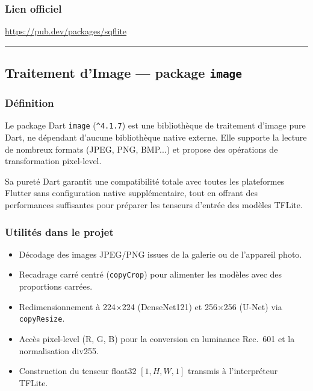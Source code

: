 \documentclass[12pt,a4paper]{report}
\begin{document}
\subsubsection*{Lien officiel}
\url{https://pub.dev/packages/sqflite}

\medskip\hrule\medskip

\subsection{Traitement d'Image --- package \texttt{image}}

\noindent\begin{minipage}[t]{0.66\textwidth}
\subsubsection*{Définition}
Le package Dart \texttt{image} (\texttt{\^{}4.1.7}) est une bibliothèque de traitement d'image pure Dart, ne dépendant d'aucune bibliothèque native externe. Elle supporte la lecture de nombreux formats (JPEG, PNG, BMP...) et propose des opérations de transformation pixel-level.

Sa pureté Dart garantit une compatibilité totale avec toutes les plateformes Flutter sans configuration native supplémentaire, tout en offrant des performances suffisantes pour préparer les tenseurs d'entrée des modèles TFLite.
\end{minipage}\hfill
\begin{minipage}[t]{0.30\textwidth}
\vspace{0pt}
\begin{center}
\end{center}
\end{minipage}

\subsubsection*{Utilités dans le projet}
\begin{itemize}
  \item Décodage des images JPEG/PNG issues de la galerie ou de l'appareil photo.
  \item Recadrage carré centré (\texttt{copyCrop}) pour alimenter les modèles avec des proportions carrées.
  \item Redimensionnement à 224$\times$224 (DenseNet121) et 256$\times$256 (U-Net) via \texttt{copyResize}.
  \item Accès pixel-level (R, G, B) pour la conversion en luminance Rec.~601 et la normalisation div255.
  \item Construction du tenseur float32 $[1,H,W,1]$ transmis à l'interpréteur TFLite.
\end{itemize}
\end{document}
